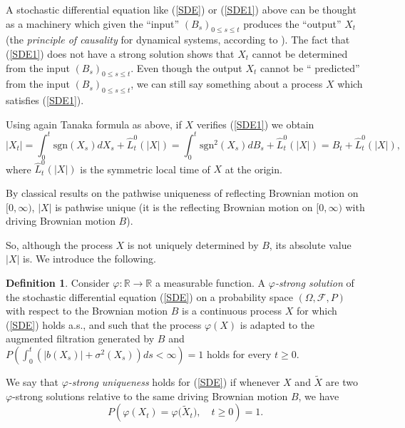 \documentclass[reqno]{amsart}
\theoremstyle{definition}
\newtheorem{definition}[theorem]{Definition}
\theoremstyle{remark}
\numberwithin{equation}{section}
\begin{document}
A stochastic differential equation like (\ref{SDE}) or (\ref{SDE1}) above
can be thought as a machinery which given the ``input'' $\left(B_{s}\right)_{0\le s\le t}$ produces the ``output'' $X_{t}$ (the \emph{principle of causality} for
dynamical systems, according to \cite{Karatzas-Shreve}). The fact that (\ref{SDE1}) does not have a strong solution shows that $X_{t}$ cannot be
determined from the input $\left(B_{s}\right)_{0\le s \le t}$. Even though the output $X_{t}$ cannot be
`` predicted'' from the input $\left(B_{s}\right)_{0\le s \le t}$, we can still say something about a process $X$ which satisfies (\ref{SDE1}).

Using again Tanaka formula as above, if $X$ verifies (\ref{SDE1}) we obtain
\[
\left\vert X_{t}\right\vert =\int_{0}^{t}\mathrm{sgn}\left( X_{s}\right)
dX_{s}+\widehat{L}_{t}^{0}(\vert X\vert)=\int_{0}^{t} \mathrm{sgn}^2\left( X_{s}\right) dB_{s}+\widehat{L}_{t}^{0}(\vert X \vert)=B_{t}+\widehat{L}_{t}^{0}(\vert X \vert ),
\]
where $\widehat{L}_t^0(\vert X\vert)$ is the symmetric local time of $X$ at the origin.

By classical results on the pathwise uniqueness of reflecting Brownian
motion on $[0,\infty )$, $\left\vert X\right\vert $ is pathwise unique
(it is the reflecting Brownian motion on $[0,\infty )$ with driving Brownian
motion $B$).

So, although the process $X$ is not uniquely determined by $B$, its absolute
value $\left\vert X\right\vert $ is. We introduce the following.

\begin{definition}
\label{varphi strong solution}Consider $\varphi :\mathbb{R\rightarrow R}$ a
measurable function. A \emph{$\varphi $-strong solution} of the stochastic differential equation (\ref{SDE}) on a probability space $\left(
\Omega ,\mathcal{F},P\right) $ with respect to the Brownian motion $B$
is a continuous process $X$ for which (\ref{SDE}) holds a.s., and such
that the process $\varphi \left( X\right) $ is adapted to the augmented filtration
generated by $B$ and $P\left( \int_{0}^{t}(\left\vert b\left(
X_{s}\right) \right\vert +\sigma ^{2}\left( X_{s}\right)) ds<\infty \right)
=1 $ holds for every $t\geq 0$.

We say that \emph{$\varphi $-strong uniqueness} holds for (\ref{SDE}) if whenever $X$ and $\widetilde{X}$ are two $\varphi $-strong solutions relative
to the same driving Brownian motion $B$, we have $$P\left( \varphi \left(
X_{t}\right) =\varphi \big( \widetilde{X}_{t} \big) ,\quad t\geq 0\right)
=1.$$
\end{definition}
\end{document}
